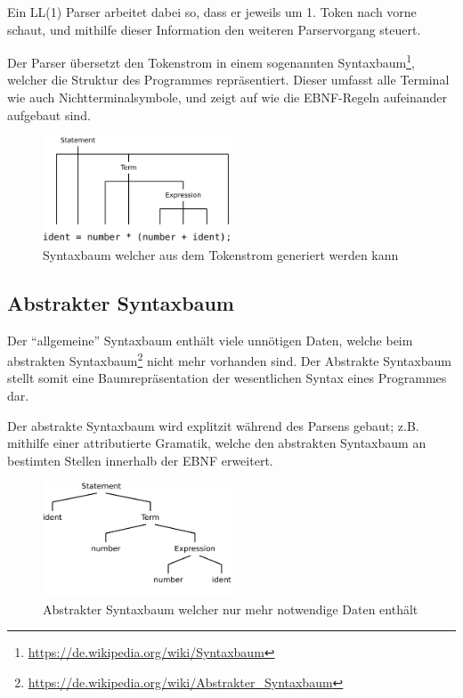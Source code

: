 Ein LL(1) Parser arbeitet dabei so, dass er jeweils um 1. Token nach vorne schaut, und mithilfe dieser Information den weiteren Parservorgang steuert.


\newpage


Der Parser \"ubersetzt den Tokenstrom in einem sogenannten Syntaxbaum\footnote{\url{https://de.wikipedia.org/wiki/Syntaxbaum}}, welcher die Struktur des Programmes repr\"asentiert. Dieser umfasst alle Terminal wie auch Nichtterminalsymbole, und zeigt auf wie die EBNF-Regeln aufeinander aufgebaut sind.

\begin{figure}[h]
\centering
\includegraphics[width=0.5\textwidth]{./media/images/compiler/parser_syntaxtree.png}
\caption{Syntaxbaum welcher aus dem Tokenstrom generiert werden kann}
\label{compiler_parser_syntaxtree}
\end{figure}

\subsection{Abstrakter Syntaxbaum}

Der ``allgemeine'' Syntaxbaum enth\"alt viele unn\"otigen Daten, welche beim abstrakten Syntaxbaum\footnote{\url{https://de.wikipedia.org/wiki/Abstrakter_Syntaxbaum}} nicht mehr vorhanden sind. Der Abstrakte Syntaxbaum stellt somit eine Baumrepr\"asentation der wesentlichen Syntax eines Programmes dar.

Der abstrakte Syntaxbaum wird explitzit w\"ahrend des Parsens gebaut; z.B. mithilfe einer attributierte Gramatik, welche den abstrakten Syntaxbaum an bestimten Stellen innerhalb der EBNF erweitert.

\begin{figure}[h]
\centering
\includegraphics[width=0.5\textwidth]{./media/images/compiler/abstract_syntaxtree.png}
\caption{Abstrakter Syntaxbaum welcher nur mehr notwendige Daten enth\"alt}
\label{compiler_parser_syntaxtree}
\end{figure}

